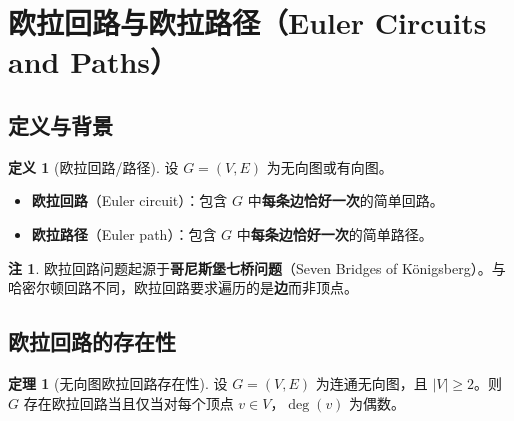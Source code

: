 \documentclass[UTF8,11pt,a4paper]{ctexbook}   %
\theoremstyle{definition}
\newtheorem{definition}{定义}[section]
\newtheorem{theorem}{定理}[section]
\newtheorem{remark}{注}[section]
\begin{document}
\section{欧拉回路与欧拉路径（Euler Circuits and Paths）}

\subsection{定义与背景}

\begin{definition}[欧拉回路/路径]
设 $G=(V,E)$ 为无向图或有向图。
\begin{itemize}
    \item \textbf{欧拉回路}（Euler circuit）：包含 $G$ 中\textbf{每条边恰好一次}的简单回路。
    \item \textbf{欧拉路径}（Euler path）：包含 $G$ 中\textbf{每条边恰好一次}的简单路径。
\end{itemize}
\end{definition}

\begin{remark}
欧拉回路问题起源于\textbf{哥尼斯堡七桥问题}（Seven Bridges of Königsberg）。与哈密尔顿回路不同，欧拉回路要求遍历的是\textbf{边}而非顶点。
\end{remark}

\subsection{欧拉回路的存在性}

\begin{theorem}[无向图欧拉回路存在性]
设 $G=(V,E)$ 为连通无向图，且 $|V|\ge 2$。则 $G$ 存在欧拉回路当且仅当对每个顶点 $v\in V$，$\deg(v)$ 为偶数。
\end{theorem}
\end{document}
